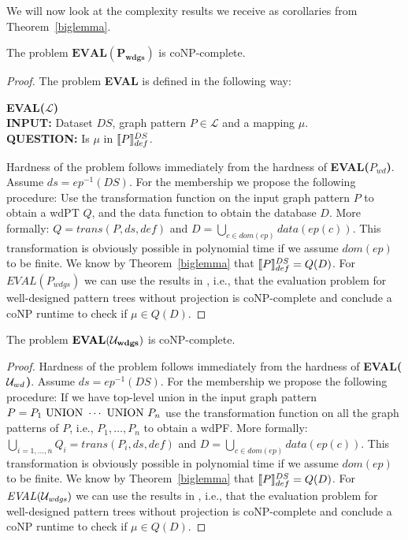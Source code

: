 We will now look at the complexity results we receive as corollaries from
Theorem~\ref{biglemma}. 
\begin{corollary}
	The problem $\mathit{\mathbf{EVAL(P_{wdgs})}}$ is coNP-complete.
\end{corollary}
\begin{proof}\label{proof:p_wdgs}
	The problem \textbf{EVAL} is defined in the following way:
\begin{framed}\noindent \textbf{EVAL($\mathcal{L}$)}\\
	\textbf{INPUT:} Dataset $DS$, graph pattern $P \in  \mathcal{L}$ and a mapping $\mu$.\\
	\textbf{QUESTION:} Is $\mu$ in $\llbracket P \rrbracket^{DS}_{def}$.
\end{framed}
Hardness of the problem follows immediately from the hardness of 
\textbf{EVAL($P_{wd}$)}.
Assume $ds = ep^{-1}(DS)$. %
For the membership we propose the following procedure:
Use the transformation function on the input graph pattern $P$ to obtain a wdPT
$Q$, and the data function to obtain the database $D$. More formally:
$Q = trans(P,ds,def)$ and $D = \bigcup\limits_{c\in dom(ep)} data(ep(c))$. This transformation is obviously
possible in polynomial time if we assume $dom(ep)$ to be finite. We know by Theorem~\ref{biglemma} that 
$\llbracket P \rrbracket^{DS}_{def} = Q(D)$.
For $\mathbf{\mathit{EVAL(P_{wdgs})}}$ we can use the results in 
\cite{perez2009semantics}, i.e., that the evaluation problem for well-designed
pattern trees without projection is coNP-complete and conclude a coNP runtime to
check if $\mu \in Q(D)$.  \end{proof}

\begin{corollary}
The problem $\mathit{\mathbf{EVAL(\mathcal{U}_{wdgs})}}$ is coNP-complete. 
\end{corollary}
\begin{proof}
Hardness of the problem follows immediately from the hardness of 
\textbf{EVAL($\mathcal{U}_{wd}$)}.
Assume $ds = ep^{-1}(DS)$. %
For the membership we propose the following procedure:
If we have top-level union in the input graph pattern $P = P_{1} \mbox{ UNION } \cdots
\mbox{ UNION } P_{n}$ use the transformation function on all the graph patterns of $P$, i.e., $P_1,\dots,P_n$
to obtain a wdPF. More formally:
$\bigcup\limits_{i=1,\dots,n}Q_i = trans(P_i,ds,def)$ and $D = \bigcup\limits_{c\in dom(ep)} data(ep(c))$. This transformation is obviously
possible in polynomial time if we assume $dom(ep)$ to be finite. We know by Theorem~\ref{biglemma} that 
$\llbracket P \rrbracket^{DS}_{def} = Q(D)$.
For $\mathbf{\mathit{EVAL(\mathcal{U}_{wdgs})}}$ we can use the results in 
\cite{perez2009semantics}, i.e., that the evaluation problem for well-designed
pattern trees without projection is coNP-complete and conclude a coNP runtime to
check if $\mu \in Q(D)$. 
\end{proof}

